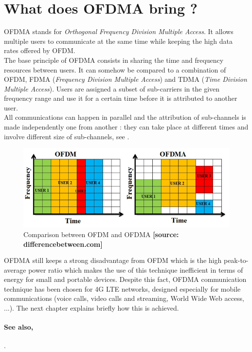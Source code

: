 \section{What does OFDMA bring ?}\label{sec:OFDMA}
%
\indent OFDMA stands for \textit{Orthogonal Frequency Division Multiple Access}. It allows multiple users to communicate at the same time while keeping the high data rates offered by OFDM.\\
%
\indent The base principle of OFDMA consists in sharing the time and frequency resources between users. It can somehow be compared to a combination of OFDM, FDMA (\textit{Frequency Division Multiple Access}) and TDMA (\textit{Time Division Multiple Access})\cite{WikiOFDMA}. Users are assigned a subset of sub-carriers in the given frequency range and use it for a certain time before it is attributed to another user.\\
\indent All communications can happen in parallel and the attribution of sub-channels is made independently one from another : they can take place at different times and involve different size of sub-channels, see .\\
%
\begin{figure}[H]
  \centering
  \includegraphics[width=\textwidth]{figures/difference-between-ofdm-and-ofdma.jpg}
  \caption{Comparison between OFDM and OFDMA \textbf{[source: differencebetween.com]}}
  \label{fig:OFDMvsOFDMA}
\end{figure}
%
\indent OFDMA still keeps a strong disadvantage from OFDM which is the high peak-to-average power ratio which makes the use of this technique inefficient in terms of energy for small and portable devices. Despite this fact, OFDMA communication technique has been chosen for 4G LTE networks, designed especially for mobile communications (voice calls, video calls and streaming, World Wide Web access, ...). The next chapter explains briefly how this is achieved.

\paragraph*{See also,}
\cite[Chap.~19]{AMolisch}.
